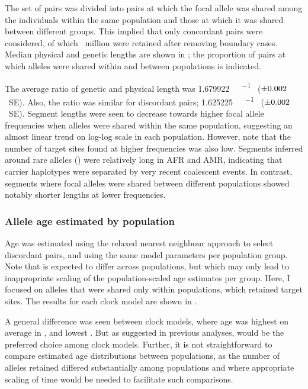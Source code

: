 The set of pairs was divided into pairs at which the focal allele was shared among the individuals within the same population and those at which it was shared between different groups.
This implied that only concordant pairs were considered, of which ~million were retained after removing boundary cases.
Median physical and genetic lengths are shown in ; the proportion of pairs at which alleles were shared within and between populations is indicated.

%

%

The average ratio of genetic and physical length was
\SI{1.679922}{\centi\morgan\per\mega\basepair} ($\pm\dec{0.002085}$~SE).
Also, the ratio was similar for discordant pairs;
\SI{1.625225}{\centi\morgan\per\mega\basepair} ($\pm\dec{0.002149}$~SE).
Segment lengths were seen to decrease towards higher focal allele frequencies when alleles were shared within the same population, suggesting an almost linear trend on log-log scale in each population.
However, note that the number of target sites found at higher frequencies was also low.
Segments inferred around rare alleles (\eg {}) were relatively long in AFR and AMR, indicating that carrier haplotypes were separated by very recent coalescent events.
In contrast, segments where focal alleles were shared between different populations showed notably shorter lengths at lower frequencies.




%
\subsubsection{Allele age estimated by population}
%

Age was estimated using the relaxed nearest neighbour approach to select discordant pairs, and using the same model parameters per population group.
Note that \Ne is expected to differ across populations, but which may only lead to inappropriate scaling of the population-scaled age estimates per group.
Here, I focused on alleles that were shared only within populations, which retained  target sites.
The results for each clock model are shown in .

%

%

A general difference was seen between clock models, where age was highest on average in \ClockM, and lowest \ClockR.
But as suggested in previous analyses, \ClockC would be the preferred choice among clock models.
Further, it is not straightforward to compare estimated age distributions between populations, as the number of alleles retained differed substantially among populations and where appropriate scaling of time would be needed to facilitate such comparisons.


